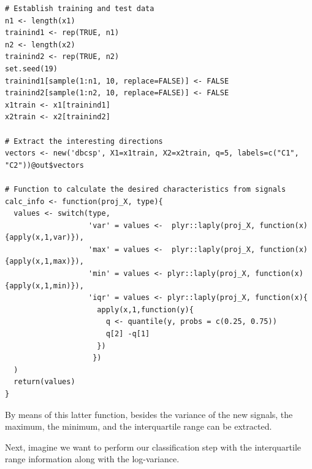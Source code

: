 \begin{verbatim}
# Establish training and test data
n1 <- length(x1)
trainind1 <- rep(TRUE, n1)
n2 <- length(x2)
trainind2 <- rep(TRUE, n2)
set.seed(19)
trainind1[sample(1:n1, 10, replace=FALSE)] <- FALSE
trainind2[sample(1:n2, 10, replace=FALSE)] <- FALSE
x1train <- x1[trainind1]
x2train <- x2[trainind2]

# Extract the interesting directions
vectors <- new('dbcsp', X1=x1train, X2=x2train, q=5, labels=c("C1", "C2"))@out$vectors

# Function to calculate the desired characteristics from signals
calc_info <- function(proj_X, type){
  values <- switch(type,
                   'var' = values <-  plyr::laply(proj_X, function(x){apply(x,1,var)}),
                   'max' = values <-  plyr::laply(proj_X, function(x){apply(x,1,max)}),
                   'min' = values <- plyr::laply(proj_X, function(x){apply(x,1,min)}),
                   'iqr' = values <- plyr::laply(proj_X, function(x){
                     apply(x,1,function(y){
                       q <- quantile(y, probs = c(0.25, 0.75))
                       q[2] -q[1]
                     })
                    })
  )
  return(values)
}
\end{verbatim}
By means of  this latter function, besides the variance of the new signals, the maximum, the minimum, and the interquartile range can be extracted.

Next, imagine we want to perform our classification step with the interquartile range information along with the log-variance. 


